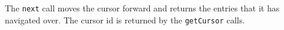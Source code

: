 The \verb+next+ call moves the cursor forward and returns the entries that it has
navigated over. The cursor id is returned by the \verb+getCursor+ calls.
